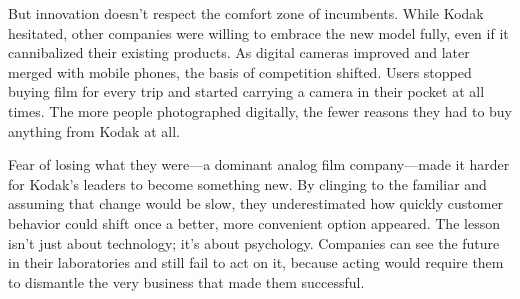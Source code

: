But innovation doesn't respect the comfort zone of incumbents. While Kodak hesitated, other companies were willing to embrace the new model fully, even if it cannibalized their existing products. As digital cameras improved and later merged with mobile phones, the basis of competition shifted. Users stopped buying film for every trip and started carrying a camera in their pocket at all times. The more people photographed digitally, the fewer reasons they had to buy anything from Kodak at all.

Fear of losing what they were—a dominant analog film company—made it harder for Kodak's leaders to become something new. By clinging to the familiar and assuming that change would be slow, they underestimated how quickly customer behavior could shift once a better, more convenient option appeared. The lesson isn't just about technology; it's about psychology. Companies can see the future in their laboratories and still fail to act on it, because acting would require them to dismantle the very business that made them successful.

\nocite{christensen:1997-innovators-dilemma}

